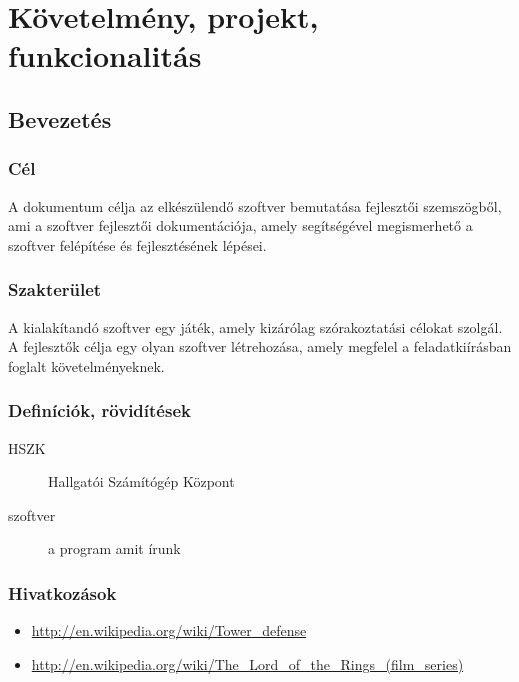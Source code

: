 %
\chapter{Követelmény, projekt, funkcionalitás}

\thispagestyle{fancy}

\section{Bevezetés}

\subsection{Cél}

A dokumentum célja az elkészülendő szoftver bemutatása fejlesztői szemszögből, ami a szoftver fejlesztői dokumentációja, amely segítségével megismerhető a szoftver felépítése és fejlesztésének lépései.

\subsection{Szakterület}

A kialakítandó szoftver egy játék, amely kizárólag szórakoztatási célokat szolgál. A fejlesztők célja egy olyan szoftver létrehozása, amely megfelel a feladatkiírásban foglalt követelményeknek.

\subsection{Definíciók, rövidítések}
\begin{description}
\item[HSZK] Hallgatói Számítógép Központ
\item[szoftver] a program amit írunk
\end{description}



\subsection{Hivatkozások}

\begin{itemize}
\item \url{http://en.wikipedia.org/wiki/Tower_defense}
\item \url{http://en.wikipedia.org/wiki/The_Lord_of_the_Rings_(film_series)}
\end{itemize}

